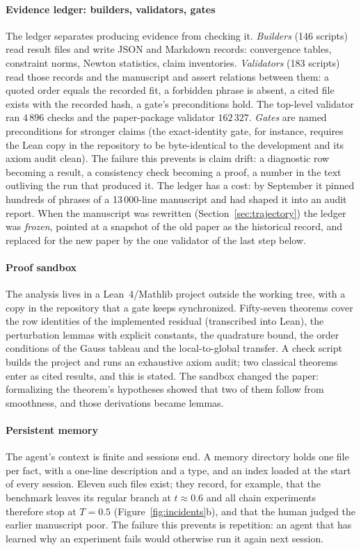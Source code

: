 \paragraph{Evidence ledger: builders, validators, gates}
The ledger separates producing evidence from checking it. \emph{Builders} (146 scripts) read
result files and write JSON and Markdown records: convergence tables, constraint norms, Newton
statistics, claim inventories. \emph{Validators} (183 scripts) read those records and the
manuscript and assert relations between them: a quoted order equals the recorded fit, a forbidden
phrase is absent, a cited file exists with the recorded hash, a gate's preconditions hold. The
top-level validator ran $4\,896$ checks and the paper-package validator $162\,327$. \emph{Gates}
are named preconditions for stronger claims (the exact-identity gate, for instance, requires the
Lean copy in the repository to be byte-identical to the development and its axiom audit clean).
The failure this prevents is claim drift: a diagnostic row becoming a result, a consistency check becoming a proof, a number in
the text outliving the run that produced it. The ledger has a cost: by September it pinned
hundreds of phrases of a 13\,000-line manuscript and had shaped it into an audit report. When the
manuscript was rewritten (Section~\ref{sec:trajectory}) the ledger was \emph{frozen}, pointed at a
snapshot of the old paper as the historical record, and replaced for the new paper by the one
validator of the last step below.

\paragraph{Proof sandbox}
The analysis lives in a Lean~4/Mathlib project outside the working tree, with a copy in the
repository that a gate keeps synchronized. Fifty-seven theorems cover the row identities of the
implemented residual (transcribed into Lean), the perturbation lemmas with explicit constants, the
quadrature bound, the order conditions of the Gauss tableau and the local-to-global transfer. A
check script builds the project and runs an exhaustive axiom audit; two classical theorems enter as
cited results, and this is stated. The sandbox changed the paper: formalizing the theorem's
hypotheses showed that two of them follow from smoothness, and those derivations became lemmas.

\paragraph{Persistent memory}
The agent's context is finite and sessions end. A memory directory holds one file per fact, with a
one-line description and a type, and an index loaded at the start of every session. Eleven such
files exist; they record, for example, that the benchmark leaves its regular branch at
$t\approx0.6$ and all chain experiments therefore stop at $T=0.5$ (Figure~\ref{fig:incidents}b),
and that the human judged the earlier manuscript poor. The failure this prevents is repetition: an
agent that has learned why an experiment fails would otherwise run it again next session.

